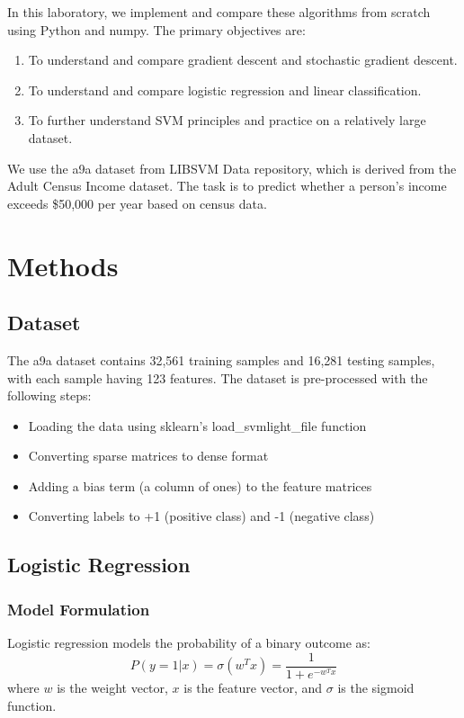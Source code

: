 \documentclass[journal, a4paper]{IEEEtran}
\begin{document}
In this laboratory, we implement and compare these algorithms from scratch using Python and numpy. The primary objectives are:

\begin{enumerate}
    \item To understand and compare gradient descent and stochastic gradient descent.
    \item To understand and compare logistic regression and linear classification.
    \item To further understand SVM principles and practice on a relatively large dataset.
\end{enumerate}

We use the a9a dataset from LIBSVM Data repository, which is derived from the Adult Census Income dataset. The task is to predict whether a person's income exceeds \$50,000 per year based on census data.

\section{Methods}
\subsection{Dataset}
The a9a dataset contains 32,561 training samples and 16,281 testing samples, with each sample having 123 features. The dataset is pre-processed with the following steps:

\begin{itemize}
    \item Loading the data using sklearn's load\_svmlight\_file function
    \item Converting sparse matrices to dense format
    \item Adding a bias term (a column of ones) to the feature matrices
    \item Converting labels to +1 (positive class) and -1 (negative class)
\end{itemize}

\subsection{Logistic Regression}
\subsubsection{Model Formulation}
Logistic regression models the probability of a binary outcome as:
\begin{equation}
P(y=1|x) = \sigma(w^T x) = \frac{1}{1 + e^{-w^T x}}
\end{equation}
where $w$ is the weight vector, $x$ is the feature vector, and $\sigma$ is the sigmoid function.
\end{document}
